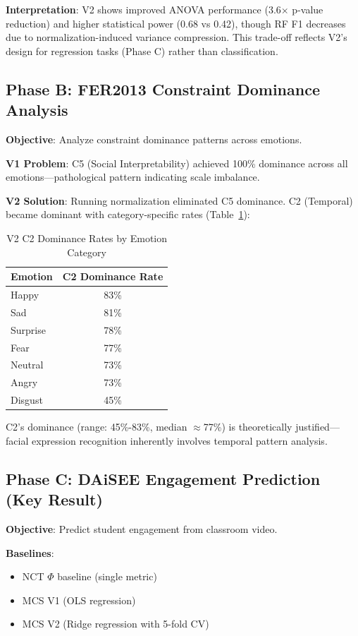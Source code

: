 \documentclass[10pt,journal,compsoc]{IEEEtran}
\begin{document}
\textbf{Interpretation}: V2 shows improved ANOVA performance (3.6$\times$ p-value reduction) and higher statistical power (0.68 vs 0.42), though RF F1 decreases due to normalization-induced variance compression. This trade-off reflects V2's design for regression tasks (Phase C) rather than classification.

\subsection{Phase B: FER2013 Constraint Dominance Analysis}

\textbf{Objective}: Analyze constraint dominance patterns across emotions.

\textbf{V1 Problem}: C5 (Social Interpretability) achieved 100\% dominance across all emotions—pathological pattern indicating scale imbalance.

\textbf{V2 Solution}: Running normalization eliminated C5 dominance. C2 (Temporal) became dominant with category-specific rates (Table~\ref{tab:c2_dominance}):

\begin{table}[!t]
\renewcommand{\arraystretch}{1.2}
\caption{V2 C2 Dominance Rates by Emotion Category}
\label{tab:c2_dominance}
\centering
\begin{tabular}{lc}
\toprule
\textbf{Emotion} & \textbf{C2 Dominance Rate} \\
\midrule
Happy & 83\% \\
Sad & 81\% \\
Surprise & 78\% \\
Fear & 77\% \\
Neutral & 73\% \\
Angry & 73\% \\
Disgust & 45\% \\
\bottomrule
\end{tabular}
\end{table}

C2's dominance (range: 45\%-83\%, median $\approx$77\%) is theoretically justified—facial expression recognition inherently involves temporal pattern analysis.

\subsection{Phase C: DAiSEE Engagement Prediction (Key Result)}

\textbf{Objective}: Predict student engagement from classroom video.

\textbf{Baselines}: 
\begin{itemize}
    \item NCT $\Phi$ baseline (single metric)
    \item MCS V1 (OLS regression)
    \item MCS V2 (Ridge regression with 5-fold CV)
\end{itemize}
\end{document}
